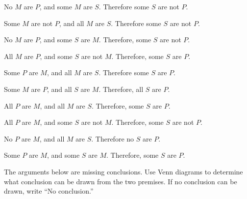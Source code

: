 \begin{exercises}

\item No $M$ are $P$, and some $M$ are $S$. Therefore some $S$ are not $P$.

\item Some $M$ are not $P$, and all $M$ are $S$. Therefore some $S$ are not $P$.
 
\item   No $M$ are $P$, and some $S$ are $M$. Therefore, some $S$ are not $P$.
 
\item All $M$ are $P$, and some $S$ are not $M$. Therefore, some $S$ are $P$.
 
\item Some $P$ are $M$, and all $M$ are $S$. Therefore some $S$ are $P$.
 
\item Some $M$ are $P$, and all $S$ are $M$. Therefore, all $S$ are $P$.
 
\item All $P$ are $M$, and all $M$ are $S$. Therefore, some $S$ are $P$.

 \item  All $P$ are $M$, and some $S$ are not $M$. Therefore, some $S$ are not $P$. 

\item No $P$ are $M$, and all $M$ are $S$. Therefore no $S$ are $P$.
 
\item Some $P$ are $M$, and some $S$ are $M$. Therefore, some $S$ are $P$.
 \end{exercises}

\noindent\problempart The arguments below are missing conclusions. Use Venn diagrams to determine what conclusion can be drawn from the two premises. If no conclusion can be drawn, write ``No conclusion.'' \label{no_conclusion_set1}

